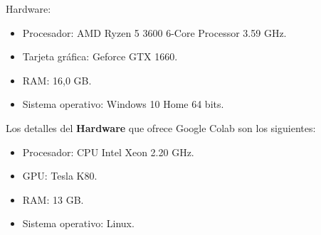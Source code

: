 \begin{itemize}
    \end{itemize}
    
Hardware:

    \begin{itemize}
        \item Procesador: AMD Ryzen 5 3600 6-Core Processor 3.59 GHz.
        \item Tarjeta gráfica: Geforce GTX 1660.
        \item RAM: 16,0 GB.
        \item Sistema operativo: Windows 10 Home 64 bits.
    \end{itemize}
    

    
Los detalles del \textbf{Hardware} que ofrece Google Colab son los siguientes:

    \begin{itemize}
        \item Procesador: CPU Intel Xeon 2.20 GHz.
        \item GPU: Tesla K80.
        \item RAM: 13 GB.
        \item Sistema operativo: Linux.
    \end{itemize}